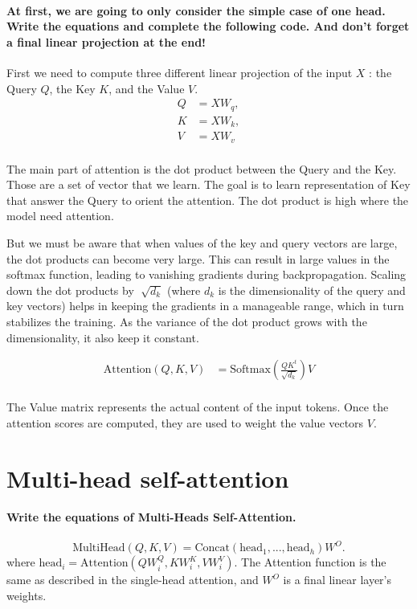 \paragraph{At first, we are going to only consider the simple case of one head. Write the equations and complete the following code. And don't forget a final linear projection at the end!}

First we need to compute three different linear projection of the input $ X $ : the Query $ Q $, the Key $ K $, and the Value $ V $.
\begin{align*}
    Q &= X W_q, \\
    K &= X W_k, \\
    V &= X W_v  \\
\end{align*}


The main part of attention is the dot product between the Query and the Key. Those are a set of vector that we learn. The goal is to learn representation of Key that answer the Query to orient the attention. The dot product is high where the model need attention. 

But we must be aware that when values of the key and query vectors are large, the dot products can become very large. This can result in large values in the softmax function, leading to vanishing gradients during backpropagation. Scaling down the dot products by $ \sqrt[]{d_k} $ (where $ d_k $  is the dimensionality of the query and key vectors) helps in keeping the gradients in a manageable range, which in turn stabilizes the training. As the variance of the dot product grows with the dimensionality, it also keep it constant.

\begin{align*}
    \text{Attention}(Q, K, V) &= \text{Softmax}\left(\frac{QK^t}{\sqrt{d_k}}\right)V \\
\end{align*}

The Value matrix represents the actual content of the input tokens. Once the attention scores are computed, they are used to weight the value vectors $ V $.

\section{Multi-head self-attention}

\paragraph{Write the equations of Multi-Heads Self-Attention.}
\[
    \text{MultiHead}(Q, K, V) = \text{Concat}(\text{head}_1, ..., \text{head}_h)W^O
.\]
where $\text{head}_i = \text{Attention}(QW_i^Q, KW_i^K, VW_i^V)$. The Attention function is the same as described in the single-head attention, and $W^O$ is a final linear layer's weights.

